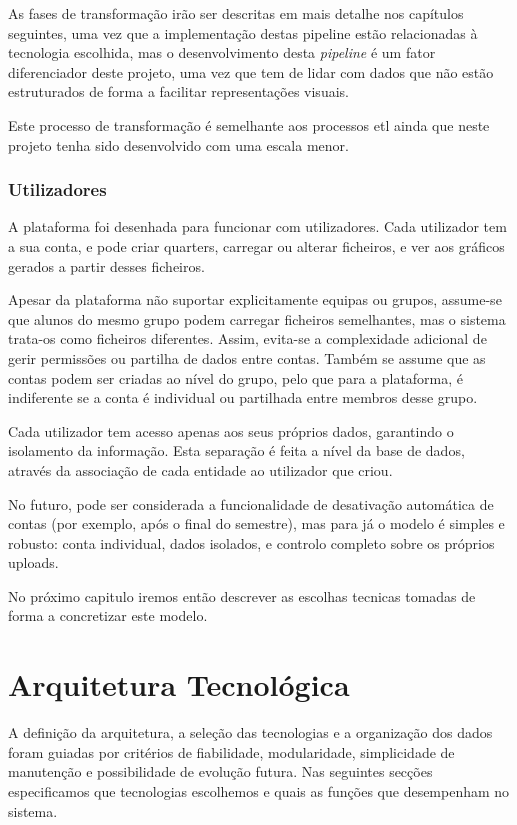 As fases de transformação irão ser descritas em mais detalhe nos capítulos seguintes, uma vez que a implementação destas pipeline estão relacionadas à tecnologia escolhida, mas o desenvolvimento desta \textit{pipeline} é um fator diferenciador deste projeto, uma vez que tem de lidar com dados que não estão estruturados de forma a facilitar representações visuais. 

Este processo de transformação é semelhante aos processos \gls{etl} ainda que neste projeto tenha sido desenvolvido com uma escala menor.

\subsubsection{Utilizadores}

A plataforma foi desenhada para funcionar com utilizadores. Cada utilizador tem a sua conta, e pode criar quarters, carregar ou alterar ficheiros, e ver aos gráficos gerados a partir desses ficheiros.

Apesar da plataforma não suportar explicitamente equipas ou grupos, assume-se que alunos do mesmo grupo podem carregar ficheiros semelhantes, mas o sistema trata-os como ficheiros diferentes. Assim, evita-se a complexidade adicional de gerir permissões ou partilha de dados entre contas. Também se assume que as contas podem ser criadas ao nível do grupo, pelo que para a plataforma, é indiferente se a conta é individual ou partilhada entre membros desse grupo.

Cada utilizador tem acesso apenas aos seus próprios dados, garantindo o isolamento da informação. Esta separação é feita a nível da base de dados, através da associação de cada entidade ao utilizador que criou.

No futuro, pode ser considerada a funcionalidade de desativação automática de contas (por exemplo, após o final do semestre), mas para já o modelo é simples e robusto: conta individual, dados isolados, e controlo completo sobre os próprios uploads.

No próximo capitulo iremos então descrever as escolhas tecnicas tomadas de forma a concretizar este modelo.


\section{Arquitetura Tecnológica}
\label{sec:tec}

A definição da arquitetura, a seleção das tecnologias e a organização dos dados foram guiadas por critérios de fiabilidade, modularidade, simplicidade de manutenção e possibilidade de evolução futura.  Nas seguintes secções especificamos que tecnologias escolhemos e quais as funções que desempenham no sistema.

